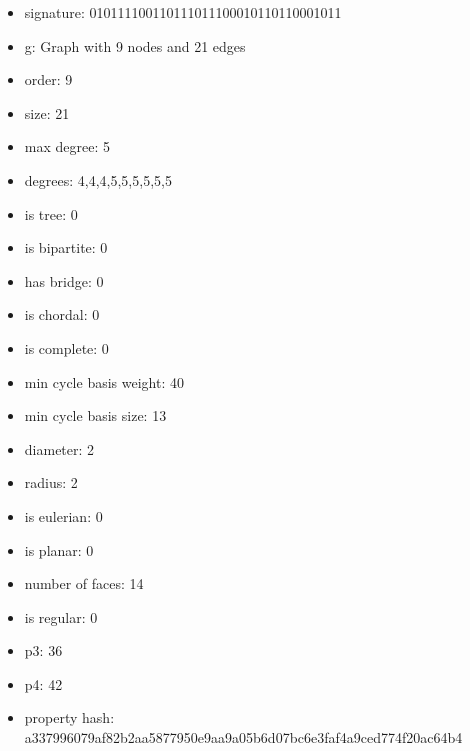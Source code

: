 \newpage
\begin{figure}
\end{figure}
\begin{itemize}
\item signature: 010111100110111011100010110110001011
\item g: Graph with 9 nodes and 21 edges
\item order: 9
\item size: 21
\item max degree: 5
\item degrees: 4,4,4,5,5,5,5,5,5
\item is tree: 0
\item is bipartite: 0
\item has bridge: 0
\item is chordal: 0
\item is complete: 0
\item min cycle basis weight: 40
\item min cycle basis size: 13
\item diameter: 2
\item radius: 2
\item is eulerian: 0
\item is planar: 0
\item number of faces: 14
\item is regular: 0
\item p3: 36
\item p4: 42
\item property hash: a337996079af82b2aa5877950e9aa9a05b6d07bc6e3faf4a9ced774f20ac64b4
\end{itemize}
